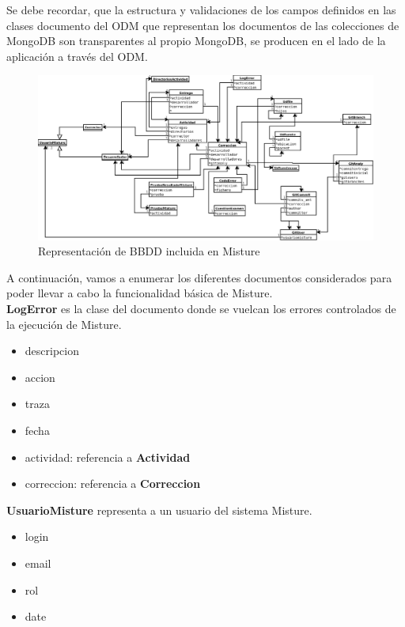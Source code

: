 Se debe recordar, que la estructura y validaciones de los campos definidos en las clases documento del ODM que representan los documentos de las colecciones de MongoDB son transparentes al propio MongoDB, se producen en el lado de la aplicación a través del ODM.\\

\begin{figure}[H]
   \centering
   \includegraphics[width=16cm]{img/Diagram4_bbdd}
   \caption{Representación de BBDD incluida en Misture}
   \label{figura:bbdd}
\end{figure}

\vspace{3cm}

A continuación, vamos a enumerar los diferentes documentos considerados para poder llevar a cabo la funcionalidad básica de Misture.\\

\textbf{LogError} es la clase del documento donde se vuelcan los errores controlados de la ejecución de Misture.
\begin{itemize}
\item descripcion
\item accion
\item traza
\item fecha
\item actividad: referencia a \textbf{Actividad}
\item correccion: referencia a \textbf{Correccion}
\end{itemize}


\textbf{UsuarioMisture} representa a un usuario del sistema Misture.
\begin{itemize}
\item login
\item email
\item rol
\item date
\end{itemize}


